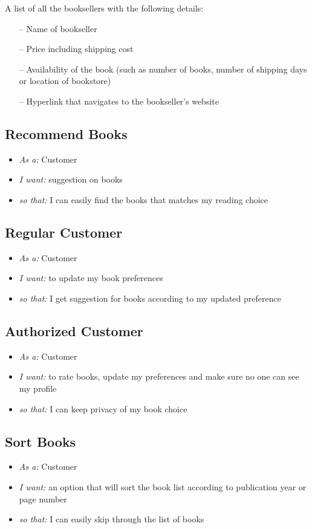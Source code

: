 \documentclass{article}
\begin{document}
A list of all the booksellers with the following details:
\begin{itemize}
	\item[--] Name of bookseller
	\item[--] Price including shipping cost
	\item[--] Availability of the book (such as number of books, number of shipping days or location of bookstore)
	\item[--]  Hyperlink that navigates to the bookseller’s website
\end{itemize}

\subsection{Recommend Books}
\begin{itemize}
\item \emph{As a:} Customer
\item \emph{I want:}  suggestion on books 
\item \emph{so that:}  I can easily find the books that matches my reading choice
\end{itemize}

\subsection{Regular Customer}
\begin{itemize}
\item \emph{As a:} Customer
\item \emph{I want:} to update my book preferences 
\item \emph{so that:} I get suggestion for books according to my updated preference
\end{itemize}

\subsection{Authorized Customer}
\begin{itemize}
\item \emph{As a:} Customer
\item \emph{I want:}  to rate books, update my preferences and make sure no one can see my profile
\item \emph{so that:} I can keep privacy of my book choice
\end{itemize}

\subsection{Sort Books}
\begin{itemize}
\item \emph{As a:} Customer
\item \emph{I want:}  an option that will sort the book list according to publication year or page number 
\item \emph{so that:} I can easily skip through the list of books
\end{itemize}
\end{document}
